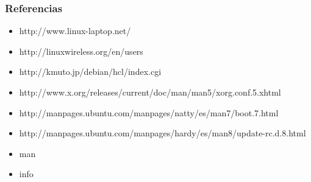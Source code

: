 \documentclass{beamer}
\begin{document}
\begin{frame}
\frametitle{Referencias}
\begin{itemize}
\item http://www.linux-laptop.net/ 
\item http://linuxwireless.org/en/users
\item http://kmuto.jp/debian/hcl/index.cgi
\item http://www.x.org/releases/current/doc/man/man5/xorg.conf.5.xhtml
\item http://manpages.ubuntu.com/manpages/natty/es/man7/boot.7.html
\item http://manpages.ubuntu.com/manpages/hardy/es/man8/update-rc.d.8.html
\item man
\item info
\end{itemize}
\end{frame}
\end{document}
